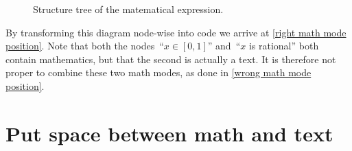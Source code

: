 \begin{figure}[tb]
  \begin{center}
  \end{center}
  \caption{Structure tree of the matematical expression.}
  \label{structure tree of math}
\end{figure}
By transforming this diagram node-wise into code we arrive at \cref{right math mode position}.
Note that both the nodes~\enquote{$x \in [0,1]$} and~\enquote{$x$ is rational} both contain mathematics, but that the second is actually a text.
It is therefore not proper to combine these two math modes, as done in \cref{wrong math mode position}.





\section{Put space between math and text}

